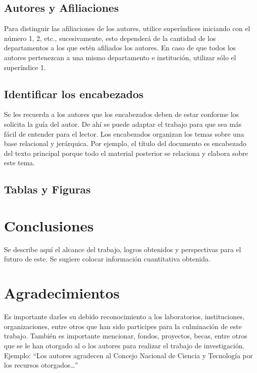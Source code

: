         \subsection{Autores y Afiliaciones}
    
        Para distinguir las afiliaciones de los autores, utilice superíndices iniciando con el número 1, 2, etc., sucesivamente, esto dependerá de la cantidad de los departamentos a los que estén afiliados los autores. En caso de que todos los autores pertenezcan a una mismo departamento e institución, utilizar sólo el superíndice 1. 
    
        \subsection{Identificar los encabezados}
    
        Se les recuerda a los autores que los encabezados deben de estar conforme los solicita la guía del autor. De ahí se puede adaptar el trabajo para que sea más fácil de entender para el lector.
        Los encabezados organizan los temas sobre una base relacional y jerárquica. Por ejemplo, el título del documento es encabezado del texto principal porque todo el material posterior se relaciona y elabora sobre este tema. 
    
        \subsection{Tablas y Figuras}
    
       
    
        \section{Conclusiones}
    
        Se describe aquí el alcance del trabajo, logros obtenidos y perspectivas para el futuro de este. Se sugiere colocar información cuantitativa obtenida.
    
        \section{Agradecimientos}
    
        Es importante darles su debido reconocimiento a los laboratorios, instituciones, organizaciones, entre otros que han sido participes para la culminación de este trabajo. También es importante mencionar, fondos, proyectos, becas, entre otros que se le han otorgado al o los autores para realizar el trabajo de investigación. Ejemplo: “Los autores agradecen al Concejo Nacional de Ciencia y Tecnología por los recursos otorgados…”
    
